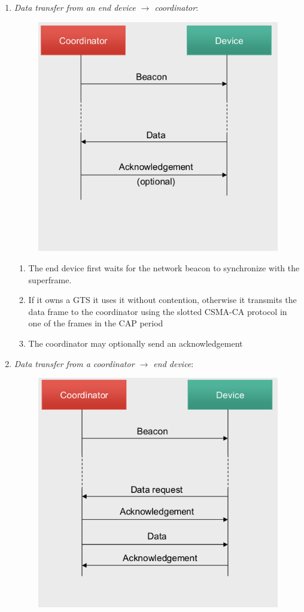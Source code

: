 \begin{enumerate}
   \item \textit{Data transfer from an end device $\longrightarrow$ coordinator}:
   \begin{paracol}{2}
      \begin{figure}[htbp]
         \centering
         \includegraphics[width=0.6\columnwidth]{images/802_datatransfer_1.png}
         \label{fig:802_datatransfer_1}
      \end{figure}
      
      \switchcolumn
      \colfill
      \begin{enumerate}
         \item The end device first waits for the network beacon to synchronize with the superframe.
         \item If it owns a GTS it uses it without contention, otherwise it transmits the data frame to the coordinator using the slotted CSMA-CA protocol in one of the frames in the CAP period
         \item The coordinator may optionally send an acknowledgement
      \end{enumerate}
      \colfill

   \end{paracol}
      \item \textit{Data transfer from a coordinator $\longrightarrow$ end device}:
   \begin{paracol}{2}
      \colfill
      \begin{figure}[htbp]
         \centering
         \includegraphics[width=0.6\columnwidth]{images/802_datatransfer_2.png}
         \label{fig:802_datatransfer_2}
      \end{figure}
      \colfill
      \switchcolumn
      

\end{paracol}
\end{enumerate}
